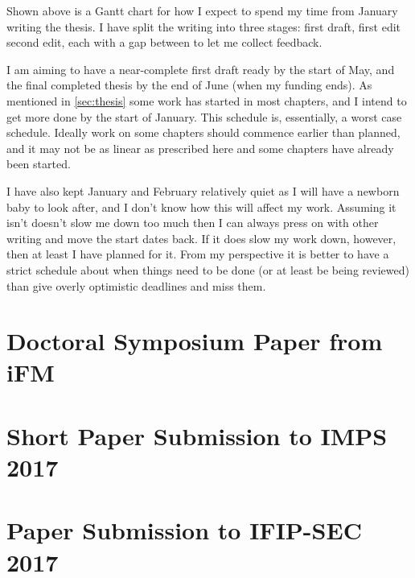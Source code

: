 \documentclass[a4paper]{scrartcl}
\begin{document}
Shown above is a Gantt chart for how I expect to spend my time from January
writing the thesis.  I have split the writing into three stages: first draft,
first edit second edit, each with a gap between to let me collect feedback.

I am aiming to have a near-complete first draft ready by the start of May, and
the final completed thesis by the end of June (when my funding ends). As
mentioned in \autoref{sec:thesis} some work has started in most chapters, and I
intend to get more done by the start of January.  This schedule is,
essentially, a worst case schedule.  Ideally work on some chapters should
commence earlier than planned, and it may not be as linear as prescribed here
and some chapters have already been started.

I have also kept January and February relatively quiet as I will have a newborn
baby to look after, and I don't know how this will affect my work. Assuming it
isn't doesn't slow me down too much then I can always press on with other
writing and move the start dates back.  If it does slow my work down, however,
then at least I have planned for it.  From my perspective it is better to have
a strict schedule about when things need to be done (or at least be being
reviewed) than give overly optimistic deadlines and miss them.

\pagebreak
\section{Doctoral Symposium Paper from iFM}
\label{sec:paper}


\section{Short Paper Submission to IMPS 2017}


\section{Paper Submission to IFIP-SEC 2017}

\end{document}
